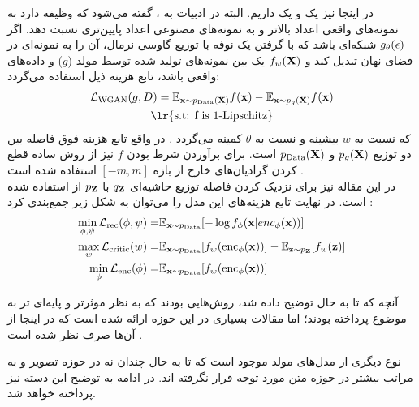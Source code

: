در اینجا نیز یک \generator{} و یک \discriminator{} داریم. البته در ادبیات \wgan{} به \discriminator{}،
گفته می‌شود که وظیفه دارد به نمونه‌های واقعی اعداد بالاتر و به نمونه‌های مصنوعی اعداد پایین‌تری نسبت دهد.
اگر $g_\theta({\bf \epsilon})$ شبکه‌ای باشد که با گرفتن یک نوفه با توزیع گاوسی نرمال، آن را به نمونه‌ای در فضای نهان تبدیل کند و $f_w({\bf X})$ یک \critic{} بین نمونه‌های تولید شده توسط مولد ($g$) و داده‌های واقعی باشد، تابع هزینه ذیل استفاده می‌گردد:
\begin{gather}
	\mathcal{L}_\text{WGAN} (g, D)=
	\expected_{\bff{x} \sim p_\text{Data}(\bff{X})} f(\bff{x})
	- \expected_{\bff{x} \sim p_g(\bff{X})} f(\bff{x})
	\\
	\text{\lr{s.t: f is 1-Lipschitz}} \nonumber
\end{gather}
که نسبت به $w$ بیشینه و نسبت به $\theta$ کمینه می‌گردد \cite{wgan}. در واقع تابع هزینه فوق فاصله \wasser{} بین دو توزیع $p_g({\bf X})$ و $p_\text{Data}({\bf X})$ است. برای برآوردن شرط  بودن $f$ نیز از روش ساده قطع کردن گرادیان‌های خارج از بازه $[-m, m]$ استفاده شده است \cite{wae_text_reg}.
\\
در این مقاله نیز برای نزدیک کردن فاصله توزیع حاشیه‌ای $q_{\bf Z}$ با $p_{\bf Z}$ از \wgan{} استفاده شده است. در نهایت تابع هزینه‌های این مدل را می‌توان به شکل زیر جمع‌بندی کرد \cite{wae_text_reg}:
\begin{align}
	\min_{\phi, \psi} {\mathcal{L}}_\text{rec}(\phi, \psi) = & \mathbb E_{{\bf x} \sim p_\text{Data}} [- \log f_\phi({\bf x}|enc_\phi({\bf x}))] \nonumber
	\\
	\max_{w} {\mathcal{L}}_\text{critic}(w) =                &
	\mathbb E_{{\bf x} \sim p_\text{Data}} [f_w(\text{enc}_\phi({\bf x}))]
	-\mathbb E_{{\bf z} \sim p_{\bf Z}} [f_w({\bf z})] \nonumber
	\\
	\min_{\phi} {\mathcal{L}}_\text{enc}(\phi) =                   &
	\mathbb E_{{\bf x} \sim p_\text{Data}} [f_w(\text{enc}_\phi({\bf x}))]
\end{align}


آنچه که تا به حال توضیح داده شد، روش‌هایی بودند که به نظر موثرتر و پایه‌ای تر به موضوع پرداخته بودند؛ اما مقالات بسیاری در این حوزه ارائه شده است که در اینجا از آن‌ها صرف نظر شده است \cite{vae_decflow, vae_hybrid, vae_multilevel, vae_spherical}.

نوع دیگری از مدل‌های مولد موجود است که تا به حال چندان نه در حوزه تصویر و به مراتب بیشتر در حوزه متن مورد توجه قرار نگرفته اند. در ادامه به توضیح این دسته نیز پرداخته خواهد شد.
